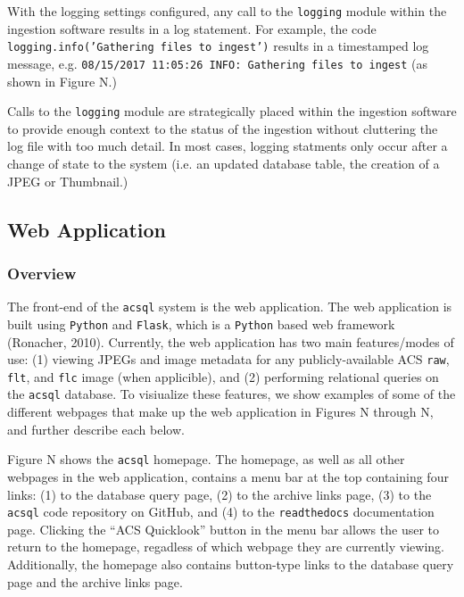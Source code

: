 \documentclass[10pt,journal,compsoc]{IEEEtran}
\begin{document}
With the logging settings configured, any call to the \texttt{logging} module within the ingestion
software results in a log statement.  For example, the code \texttt{logging.info('Gathering files to
ingest')} results in a timestamped log message, e.g.
\texttt{08/15/2017 11:05:26 INFO: Gathering files to ingest} (as shown in Figure N.)

Calls to the \texttt{logging} module are strategically placed within the ingestion software to provide
enough context to the status of the ingestion without cluttering the log file with too much detail.
In most cases, logging statments only occur after a change of state to the system (i.e. an updated
database table, the creation of a JPEG or Thumbnail.)


\subsection{Web Application}

\subsubsection{Overview}

The front-end of the \texttt{acsql} system is the web application.  The web application is built using
\texttt{Python} and \texttt{Flask}, which is a \texttt{Python} based web framework (Ronacher, 2010).
Currently, the web application has two main features/modes of use: (1) viewing JPEGs and image metadata
for any publicly-available ACS \texttt{raw}, \texttt{flt}, and \texttt{flc} image (when applicible), and
(2) performing relational queries on the \texttt{acsql} database.  To visiualize these features, we show
examples of some of the different webpages that make up the web application in Figures N through N, and
further describe each below.

Figure N shows the \texttt{acsql} homepage.  The homepage, as well as all other webpages in the web
application, contains a menu bar at the top containing four links: (1) to the database query page,
(2) to the archive links page, (3) to the \texttt{acsql} code repository on GitHub, and (4) to the
\texttt{readthedocs} documentation page.  Clicking the ``ACS Quicklook'' button in the menu bar allows
the user to return to the homepage, regadless of which webpage they are currently viewing.  Additionally,
the homepage also contains button-type links to the database query page and the archive links page.
\end{document}

